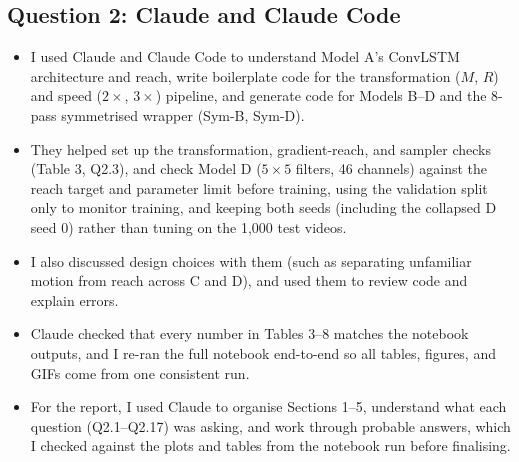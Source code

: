 \documentclass[10pt,a4paper]{article}
\begin{document}
\subsection{Question 2: Claude and Claude Code}
\begin{itemize}
  \item I used Claude and Claude Code to understand Model A's ConvLSTM architecture and reach, write boilerplate code for the transformation ($M$, $R$) and speed ($2\times$, $3\times$) pipeline, and generate code for Models B--D and the 8-pass symmetrised wrapper (Sym-B, Sym-D).
  \item They helped set up the transformation, gradient-reach, and sampler checks (Table 3, Q2.3), and check Model D ($5 \times 5$ filters, 46 channels) against the reach target and parameter limit before training, using the validation split only to monitor training, and keeping both seeds (including the collapsed D seed 0) rather than tuning on the 1,000 test videos.
  \item I also discussed design choices with them (such as separating unfamiliar motion from reach across C and D), and used them to review code and explain errors.
  \item Claude checked that every number in Tables 3--8 matches the notebook outputs, and I re-ran the full notebook end-to-end so all tables, figures, and GIFs come from one consistent run.
  \item For the report, I used Claude to organise Sections 1--5, understand what each question (Q2.1--Q2.17) was asking, and work through probable answers, which I checked against the plots and tables from the notebook run before finalising.
\end{itemize}
\end{document}
